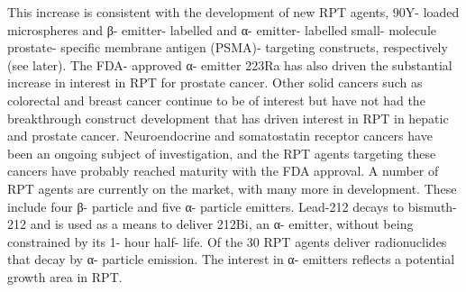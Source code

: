 \documentclass[
]{article}
\begin{document}
This increase is consistent with the development of new RPT agents, 90Y-
loaded microspheres and β- emitter- labelled and α- emitter- labelled
small- molecule prostate- specific membrane antigen (PSMA)- targeting
constructs, respectively (see later). The FDA- approved α- emitter 223Ra
has also driven the substantial increase in interest in RPT for prostate
cancer. Other solid cancers such as colorectal and breast cancer
continue to be of interest but have not had the breakthrough construct
development that has driven interest in RPT in hepatic and prostate
cancer. Neuroendocrine and somatostatin receptor cancers have been an
ongoing subject of investigation, and the RPT agents targeting these
cancers have probably reached maturity with the FDA approval. A number
of RPT agents are currently on the market, with many more in
development. These include four β- particle and five α- particle
emitters. Lead-212 decays to bismuth-212 and is used as a means to
deliver 212Bi, an α- emitter, without being constrained by its 1- hour
half- life. Of the 30 RPT agents deliver radionuclides that decay by α-
particle emission. The interest in α- emitters reflects a potential
growth area in RPT.
\end{document}
